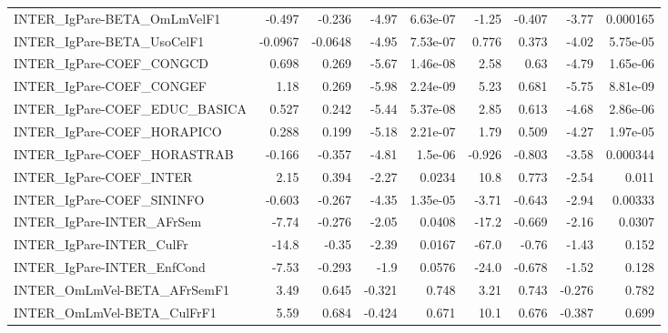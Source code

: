 \begin{tabular}{lrrrrrrrr}
INTER\_IgPare-BETA\_OmLmVelF1           &      -0.497 &       -0.236 &   -4.97 & 6.63e-07 &      -1.25 &      -0.407 &        -3.77 &      0.000165 \\
INTER\_IgPare-BETA\_UsoCelF1            &     -0.0967 &      -0.0648 &   -4.95 & 7.53e-07 &      0.776 &       0.373 &        -4.02 &      5.75e-05 \\
INTER\_IgPare-COEF\_CONGCD              &       0.698 &        0.269 &   -5.67 & 1.46e-08 &       2.58 &        0.63 &        -4.79 &      1.65e-06 \\
INTER\_IgPare-COEF\_CONGEF              &        1.18 &        0.269 &   -5.98 & 2.24e-09 &       5.23 &       0.681 &        -5.75 &      8.81e-09 \\
INTER\_IgPare-COEF\_EDUC\_BASICA         &       0.527 &        0.242 &   -5.44 & 5.37e-08 &       2.85 &       0.613 &        -4.68 &      2.86e-06 \\
INTER\_IgPare-COEF\_HORAPICO            &       0.288 &        0.199 &   -5.18 & 2.21e-07 &       1.79 &       0.509 &        -4.27 &      1.97e-05 \\
INTER\_IgPare-COEF\_HORASTRAB           &      -0.166 &       -0.357 &   -4.81 &  1.5e-06 &     -0.926 &      -0.803 &        -3.58 &      0.000344 \\
INTER\_IgPare-COEF\_INTER               &        2.15 &        0.394 &   -2.27 &   0.0234 &       10.8 &       0.773 &        -2.54 &         0.011 \\
INTER\_IgPare-COEF\_SININFO             &      -0.603 &       -0.267 &   -4.35 & 1.35e-05 &      -3.71 &      -0.643 &        -2.94 &       0.00333 \\
INTER\_IgPare-INTER\_AFrSem             &       -7.74 &       -0.276 &   -2.05 &   0.0408 &      -17.2 &      -0.669 &        -2.16 &        0.0307 \\
INTER\_IgPare-INTER\_CulFr              &       -14.8 &        -0.35 &   -2.39 &   0.0167 &      -67.0 &       -0.76 &        -1.43 &         0.152 \\
INTER\_IgPare-INTER\_EnfCond            &       -7.53 &       -0.293 &    -1.9 &   0.0576 &      -24.0 &      -0.678 &        -1.52 &         0.128 \\
INTER\_OmLmVel-BETA\_AFrSemF1           &        3.49 &        0.645 &  -0.321 &    0.748 &       3.21 &       0.743 &       -0.276 &         0.782 \\
INTER\_OmLmVel-BETA\_CulFrF1            &        5.59 &        0.684 &  -0.424 &    0.671 &       10.1 &       0.676 &       -0.387 &         0.699 \\

\end{tabular}
